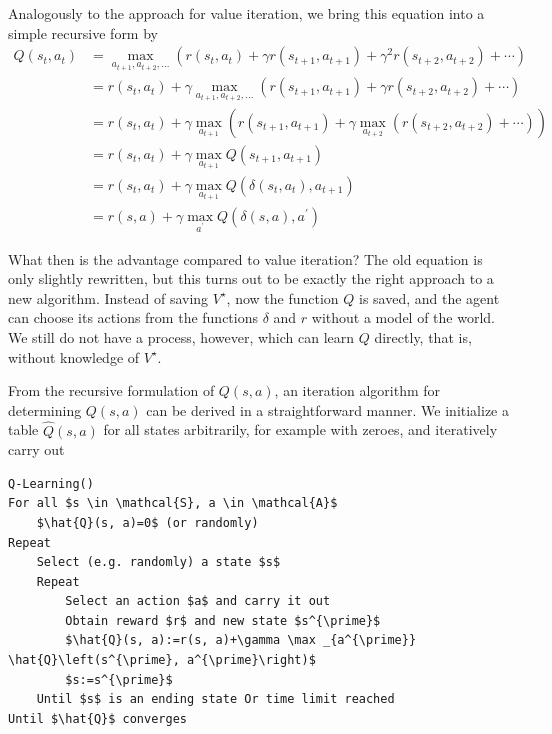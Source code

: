 \documentclass[10pt]{book}
\begin{document}
Analogously to the approach for value iteration, we bring this equation into a simple recursive form by
\begin{align*}
Q\left(s_{t}, a_{t}\right) & =\max _{a_{t+1}, a_{t+2}, \ldots}\left(r\left(s_{t}, a_{t}\right)+\gamma r\left(s_{t+1}, a_{t+1}\right)+\gamma^{2} r\left(s_{t+2}, a_{t+2}\right)+\cdots\right) \\
& =r\left(s_{t}, a_{t}\right)+\gamma \max _{a_{t+1}, a_{t+2}, \ldots}\left(r\left(s_{t+1}, a_{t+1}\right)+\gamma r\left(s_{t+2}, a_{t+2}\right)+\cdots\right) \\
& =r\left(s_{t}, a_{t}\right)+\gamma \max _{a_{t+1}}\left(r\left(s_{t+1}, a_{t+1}\right)+\gamma \max _{a_{t+2}}\left(r\left(s_{t+2}, a_{t+2}\right)+\cdots\right)\right) \\
& =r\left(s_{t}, a_{t}\right)+\gamma \max _{a_{t+1}} Q\left(s_{t+1}, a_{t+1}\right) \\
& =r\left(s_{t}, a_{t}\right)+\gamma \max _{a_{t+1}} Q\left(\delta\left(s_{t}, a_{t}\right), a_{t+1}\right) \\
& =r(s, a)+\gamma \max _{a^{\prime}} Q\left(\delta(s, a), a^{\prime}\right) \tag{10.11}
\end{align*}

What then is the advantage compared to value iteration? The old equation is only slightly rewritten, but this turns out to be exactly the right approach to a new algorithm. Instead of saving $V^{\star}$, now the function $Q$ is saved, and the agent can choose its actions from the functions $\delta$ and $r$ without a model of the world. We still do not have a process, however, which can learn $Q$ directly, that is, without knowledge of $V^{\star}$.

From the recursive formulation of $Q(s, a)$, an iteration algorithm for determining $Q(s, a)$ can be derived in a straightforward manner. We initialize a table $\hat{Q}(s, a)$ for all states arbitrarily, for example with zeroes, and iteratively carry out

\begin{verbatim}
Q-Learning()
For all $s \in \mathcal{S}, a \in \mathcal{A}$
    $\hat{Q}(s, a)=0$ (or randomly)
Repeat
    Select (e.g. randomly) a state $s$
    Repeat
        Select an action $a$ and carry it out
        Obtain reward $r$ and new state $s^{\prime}$
        $\hat{Q}(s, a):=r(s, a)+\gamma \max _{a^{\prime}} \hat{Q}\left(s^{\prime}, a^{\prime}\right)$
        $s:=s^{\prime}$
    Until $s$ is an ending state Or time limit reached
Until $\hat{Q}$ converges
\end{verbatim}
\end{document}

